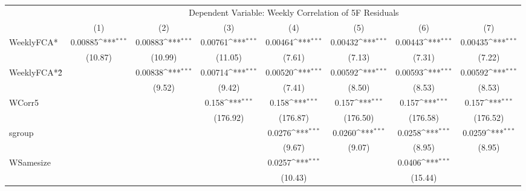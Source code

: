 {
\def\sym#1{\ifmmode^{#1}\else\(^{#1}\)\fi}
\begin{tabular}{l*{7}{c}}
\hline\hline
  & \multicolumn{7}{c}{Dependent Variable: Weekly Correlation of 5F Residuals}                 \\
  \cline{2-8}
                    &\multicolumn{1}{c}{(1)}         &\multicolumn{1}{c}{(2)}         &\multicolumn{1}{c}{(3)}         &\multicolumn{1}{c}{(4)}         &\multicolumn{1}{c}{(5)}         &\multicolumn{1}{c}{(6)}         &\multicolumn{1}{c}{(7)}         \\
\hline
WeeklyFCA*          &     0.00885\sym{***}&     0.00883\sym{***}&     0.00761\sym{***}&     0.00464\sym{***}&     0.00432\sym{***}&     0.00443\sym{***}&     0.00435\sym{***}\\
                    &     (10.87)         &     (10.99)         &     (11.05)         &      (7.61)         &      (7.13)         &      (7.31)         &      (7.22)         \\
[1em]
WeeklyFCA*\^2       &                     &     0.00838\sym{***}&     0.00714\sym{***}&     0.00520\sym{***}&     0.00592\sym{***}&     0.00593\sym{***}&     0.00592\sym{***}\\
                    &                     &      (9.52)         &      (9.42)         &      (7.41)         &      (8.50)         &      (8.53)         &      (8.53)         \\
[1em]
WCorr5              &                     &                     &       0.158\sym{***}&       0.158\sym{***}&       0.157\sym{***}&       0.157\sym{***}&       0.157\sym{***}\\
                    &                     &                     &    (176.92)         &    (176.87)         &    (176.50)         &    (176.58)         &    (176.52)         \\
[1em]
sgroup              &                     &                     &                     &      0.0276\sym{***}&      0.0260\sym{***}&      0.0258\sym{***}&      0.0259\sym{***}\\
                    &                     &                     &                     &      (9.67)         &      (9.07)         &      (8.95)         &      (8.95)         \\
[1em]
WSamesize           &                     &                     &                     &      0.0257\sym{***}&                     &      0.0406\sym{***}&                     \\
                    &                     &                     &                     &     (10.43)         &                     &     (15.44)         &                     \\

\end{tabular}}
